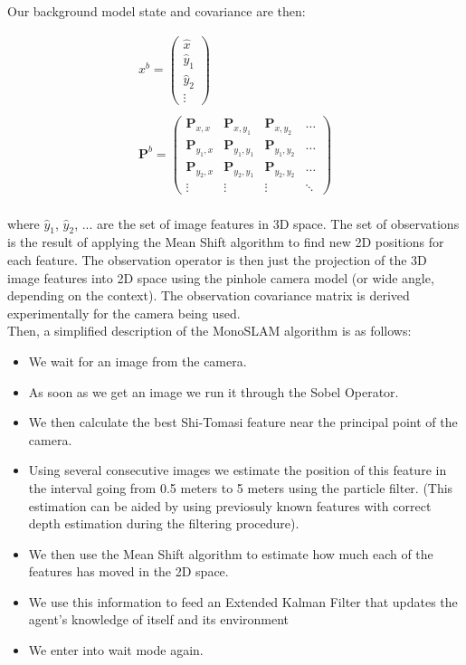\documentclass{article}
\begin{document}
Our background model state and covariance are then:

\begin{gather*}
x^b =
\begin{pmatrix}
\hat{x} \\
\hat{y}_1 \\
\hat{y}_2 \\
\vdots
\end{pmatrix} \\
\\
\mathbf{P}^b =
\begin{pmatrix}
\mathbf{P}_{x, x} & \mathbf{P}_{x, y_1} & \mathbf{P}_{x, y_2} & \dots \\
\mathbf{P}_{y_1, x} & \mathbf{P}_{y_1, y_1} & \mathbf{P}_{y_1, y_2} & \dots \\
\mathbf{P}_{y_2, x} & \mathbf{P}_{y_2, y_1} & \mathbf{P}_{y_2, y_2} & \dots \\
\vdots & \vdots & \vdots & \ddots
\end{pmatrix} \\
\end{gather*}

where $\hat{y}_1$, $\hat{y}_2$, ... are the set of image features in 3D space. The set of observations is the result of applying the Mean Shift algorithm to find new 2D positions for each feature. The observation operator is then just the projection of the 3D image features into 2D space using the pinhole camera model (or wide angle, depending on the context). The observation covariance matrix is derived experimentally for the camera being used. \\

Then, a simplified description of the MonoSLAM algorithm is as follows:

\begin{itemize}
\item We wait for an image from the camera.
\item As soon as we get an image we run it through the Sobel Operator.
\item We then calculate the best Shi-Tomasi feature near the principal point of the camera.
\item Using several consecutive images we estimate the position of this feature in the interval going from 0.5 meters to 5 meters using the particle filter. (This estimation can be aided by using previosuly known features with correct depth estimation during the filtering procedure).
\item We then use the Mean Shift algorithm to estimate how much each of the features has moved in the 2D space.
\item We use this information to feed an Extended Kalman Filter that updates the agent's knowledge of itself and its environment
\item We enter into wait mode again.
\end{itemize}
\end{document}
